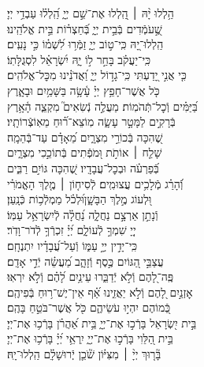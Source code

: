 \documentclass[twoside, openany, parskip=half, 11pt]{book}
\begin{document}
\begin{narrow}
הַ֥לְלוּ יָ֨הּ ׀ \hfill \break
 הַֽ֭לְלוּ אֶת־שֵׁ֣ם יְיָ֑ \hfill הַֽ֝לְל֗וּ עַבְדֵ֥י יְיָ׃ \\
 שֶׁ֣֭עֹמְֿדִים בְּֿבֵ֣ית יְיָ֑ \hfill בְּֿ֝חַצְר֗וֹת בֵּ֣ית אֱלֹהֵֽינוּ׃ \\
 הַֽלְלוּ־יָ֭הּ כִּֽי־ט֣וֹב יְיָ֑ \hfill זַמְּֿר֥וּ לִ֝שְׁמ֗וֹ כִּ֣י נָעִֽים׃ \\
 כִּֽי־יַעֲקֹ֗ב בָּחַ֣ר ל֣וֹ יָ֑הּ \hfill יִ֝שְׂרָאֵ֗ל לִסְגֻלָּתֽוֹ׃ \\
 כִּ֤י אֲנִ֣י יָ֭דַעְתִּי כִּֽי־גָד֣וֹל יְיָ֑ \hfill וַ֝אֲדֹנֵ֗ינוּ מִכׇּל־אֱלֹהִֽים׃ \\
 כֹּ֤ל אֲשֶׁר־חָפֵ֥ץ יְיָ֗ עָ֫שָׂ֥ה \hfill בַּשָּׁמַ֥יִם וּבָאָ֑רֶץ\\ בַּ֝יַּמִּ֗ים וְֿכׇל־תְּֿהֹמֽוֹת׃ \hfill
 מַעֲלֶ֣ה נְֿשִׂאִים֮ מִקְצֵ֢ה הָ֫אָ֥רֶץ\\ בְּֿרָקִ֣ים לַמָּטָ֣ר עָשָׂ֑ה \hfill מֽוֹצֵא־ר֗֝וּחַ מֵאֽוֹצְֿרוֹתָֽיו׃ \\
 שֶׁ֭הִכָּה בְּֿכוֹרֵ֣י מִצְרָ֑יִם \hfill מֵ֝אָדָ֗ם עַד־בְּֿהֵמָֽה׃ \\
 שָׁלַ֤ח ׀ אוֹתֹ֣ת וּ֭מֹפְֿתִים \hfill בְּֿתוֹכֵ֣כִי מִצְרָ֑יִם\\ בְּֿ֝פַרְעֹ֗ה וּבְכׇל־עֲבָדָֽיו׃ \hfill
 שֶׁ֭הִכָּה גּוֹיִ֣ם רַבִּ֑ים\\ וְֿ֝הָרַ֗ג מְֿלָכִ֥ים עֲצוּמִֽים׃ \hfill
 לְֿסִיח֤וֹן ׀ מֶ֤לֶךְ הָאֱמֹרִ֗י\\ וּ֭לְעוֹג מֶ֣לֶךְ הַבָּשָׁ֑ן\hfill וּ֝לְכֹ֗ל מַמְלְֿכ֥וֹת כְּֿנָֽעַן׃ \\
 וְֿנָתַ֣ן אַרְצָ֣ם נַחֲלָ֑ה \hfill נַ֝חֲלָ֗ה לְֿיִשְׂרָאֵ֥ל עַמּֽוֹ׃ \\
 יְיָ֭ שִׁמְךָ֣ לְֿעוֹלָ֑ם \hfill יְ֝יָ֗ זִכְרְֿךָ֥ לְֿדֹר־וָדֹֽר׃ \\
 כִּֽי־יָדִ֣ין יְיָ֣ עַמּ֑וֹ \hfill וְֿעַל־עֲ֝בָדָ֗יו יִתְנֶחָֽם׃ \\
 עֲצַבֵּ֣י הַ֭גּוֹיִם כֶּ֣סֶף וְֿזָהָ֑ב \hfill מַ֝עֲשֵׂ֗ה יְֿדֵ֣י אָדָֽם׃ \\
 פֶּֽה־לָ֭הֶם וְֿלֹ֣א יְֿדַבֵּ֑רוּ \hfill עֵינַ֥יִם לָ֝הֶ֗ם וְֿלֹ֣א יִרְאֽוּ׃ \\
 אׇזְנַ֣יִם לָ֭הֶם וְֿלֹ֣א יַאֲזִ֑ינוּ \hfill אַ֗֝ף אֵין־יֶשׁ־ר֥וּחַ בְּֿפִיהֶֽם׃ \\
 כְּֿ֭מוֹהֶם יִהְי֣וּ עֹשֵׂיהֶ֑ם \hfill כֹּ֖ל אֲשֶׁר־בֹּטֵ֣חַ בָּהֶֽם׃ \\
 בֵּ֣ית יִ֭שְׂרָאֵל בָּרְֿכ֣וּ אֶת־יְיָ֑ \hfill בֵּ֥ית אַ֝הֲרֹ֗ן בָּרְֿכ֥וּ אֶת־יְיָ׃ \\
 בֵּ֣ית הַ֭לֵּוִי בָּרְֿכ֣וּ אֶת־יְיָ֑ \hfill יִֽרְאֵ֥י יְ֝יָ֗ בָּרְֿכ֥וּ אֶת־יְיָ׃ \\
 בָּ֘ר֤וּךְ יְיָ֨ ׀ מִצִּיּ֗וֹן שֹׁ֘כֵ֤ן יְֽֿרוּשָׁלָ֗‍ִם \hfill הַֽלְלוּ־יָֽהּ׃ \\



\end{narrow}
\end{document}
